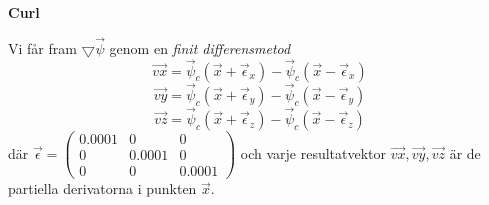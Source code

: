 \documentclass[a4paper]{article}
\begin{document}
\begin{multicols}{2}
\textbf{Curl}

Vi får fram $\bigtriangledown \vec{\psi}$ genom en \textit{finit differensmetod}
\begin{equation}
\vec{vx} = \vec{\psi}_c(\vec{x} + \vec{\epsilon}_x  ) - \vec{\psi}_c(\vec{x} - \vec{\epsilon}_x  )
\end{equation}
\begin{equation}
\vec{vy} = \vec{\psi}_c(\vec{x} + \vec{\epsilon}_y  ) - \vec{\psi}_c(\vec{x} - \vec{\epsilon}_y  )
\end{equation}
\begin{equation}
\vec{vz} = \vec{\psi}_c(\vec{x} + \vec{\epsilon}_z  ) - \vec{\psi}_c(\vec{x} - \vec{\epsilon}_z  )
\end{equation}
där $\vec{\epsilon} = \begin{pmatrix}
0.0001 & 0 & 0\\ 
0 & 0.0001 & 0\\ 
0 & 0 & 0.0001
\end{pmatrix}$ och varje resultatvektor $\vec{vx},\vec{vy},\vec{vz}$ är de partiella derivatorna i punkten $\vec{x}$.


\end{multicols}
\end{document}
